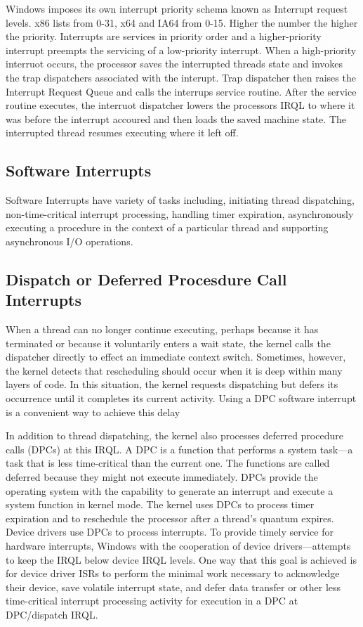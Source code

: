 \documentclass[letterpaper,10pt,draftclsnofoot,onecolumn]{IEEEtran}
\begin{document}
Windows imposes its own interrupt priority schema known as Interrupt request levels. x86 lists from 0-31, x64 and IA64 from 0-15. Higher the number the higher the priority. Interrupts are services in priority order and a higher-priority interrupt preempts the servicing of a low-priority interrupt. When a high-priority interruot occurs, the processor saves the interrupted threads state and invokes the trap dispatchers associated with the interupt. Trap dispatcher then raises the Interrupt Request Queue and calls the interrups service routine. After the service routine executes, the interruot dispatcher lowers the processors IRQL to where it was before the interrupt accoured and then loads the saved machine state. The interrupted thread resumes executing where it left off.

\subsection*{Software Interrupts}

Software Interrupts have variety of tasks including, initiating thread dispatching, non-time-critical interrupt processing, handling timer expiration, asynchronously executing a procedure in the context of a particular thread and supporting asynchronous I/O operations.

\subsection*{Dispatch or Deferred Procesdure Call Interrupts}

When a thread can no longer continue executing, perhaps because it has terminated or because it voluntarily enters a wait state, the kernel calls the dispatcher directly to effect an immediate context switch. Sometimes, however, the kernel detects that rescheduling should occur when it is deep within many layers of code. In this situation, the kernel requests dispatching but defers its occurrence until it completes its current activity. Using a DPC software interrupt is a convenient way to achieve this delay

In addition to thread dispatching, the kernel also processes deferred procedure calls (DPCs) at this IRQL. A DPC is a function that performs a system task—a task that is less time-critical than the current one. The functions are called deferred because they might not execute immediately. DPCs provide the operating system with the capability to generate an interrupt and execute a system function in kernel mode. The kernel uses DPCs to process timer expiration and to reschedule the processor after a thread’s quantum expires. Device drivers use DPCs to process interrupts. To provide timely service for hardware interrupts, Windows with the cooperation of device drivers—attempts to keep the IRQL below device IRQL levels. One way that this goal is achieved is for device driver ISRs to perform the minimal work necessary to acknowledge their device, save volatile interrupt state, and defer data transfer or other less time-critical interrupt processing activity for execution in a DPC at DPC/dispatch IRQL.
\end{document}

